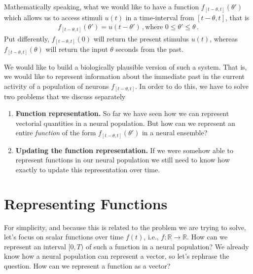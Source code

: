 \documentclass[10pt,letterpaper,oneside]{article}
\begin{document}
Mathematically speaking, what we would like to have a function $f_{[t - \theta, t]}(\theta')$ which allows us to access stimuli $u(t)$ in a time-interval from $[t - \theta, t]$, that is
\begin{align*}
	f_{[t - \theta, t]}(\theta') = u\left(t - \theta' \right) \,, \text{where } 0 \leq \theta' \leq \theta \,.
\end{align*}
Put differently, $f_{[t - \theta, t]}(0)$ will return the present stimulus $u(t)$, whereas $f_{[t - \theta, t]}(\theta)$ will return the input $\theta$ seconds from the past.

We would like to build a biologically plausible version of such a system. That is, we would like to represent information about the immediate past in the current activity of a population of neurons $f_{[t - \theta, t]}$. In order to do this, we have to solve two problems that we discuss separately
\begin{enumerate}[1.]
	\item \textbf{Function representation.} So far we have seen how we can represent vectorial quantities in a neural population. But how can we represent an entire \emph{function} of the form $f_{[t - \theta, t]}(\theta')$ in a neural ensemble?
	\item \textbf{Updating the function representation.} If we were somehow able to represent functions in our neural population we still need to know how exactly to update this representation over time.
\end{enumerate}



\section{Representing Functions}

For simplicity, and because this is related to the problem we are trying to solve, let's focus on scalar functions over time $f(t)$, i.e., $f : \mathbb{R} \longrightarrow \mathbb{R}$. How can we represent an interval $[0, T)$ of such a function in a neural population? We already know how a neural population can represent a vector, so let's rephrase the question. How can we represent a function as a vector?
\end{document}
